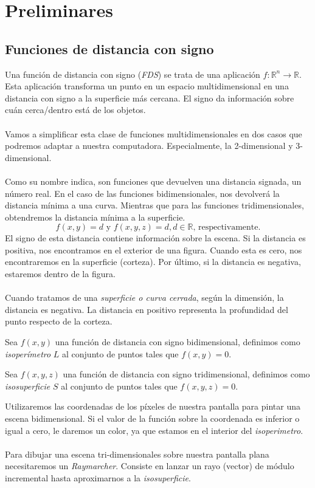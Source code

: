 \chapter{Preliminares}


\section{Funciones de distancia con signo}

Una función de distancia con signo (\textit{FDS}) se trata de una aplicación \(f: \mathbb{R}^n\longrightarrow \mathbb{R}\). Esta aplicación transforma un punto en un espacio multidimensional en una distancia con signo a la superficie más cercana. El signo da información sobre cuán cerca/dentro está de los objetos.\\\\
Vamos a simplificar esta clase de funciones multidimensionales en dos casos que podremos adaptar a nuestra computadora. Especialmente, la 2-dimensional y 3-dimensional.\\\\
Como su nombre indica, son funciones que devuelven una distancia signada, un número real. En el caso de las funciones bidimensionales, nos devolverá la distancia mínima a una curva. Mientras que para las funciones tridimensionales, obtendremos la distancia mínima a la superficie. 
\[f(x, y)=d \text{ y } f(x,y,z)=d , d \in \mathbb{R}\text{, respectivamente.}\]
El signo de esta distancia contiene información sobre la escena. Si la distancia es positiva, nos encontramos en el exterior de una figura. Cuando esta es cero, nos encontraremos en la superficie (corteza). Por último, si la distancia es negativa, estaremos dentro de la figura.\\\\
Cuando tratamos de una \textit{superficie o curva cerrada}, según la dimensión, la distancia es negativa. La distancia en positivo representa la profundidad del punto respecto de la corteza. 

\begin{definition}
	Sea \(f(x, y)\) una función de distancia con signo bidimensional, definimos como \textit{isoperímetro} \(L\) al conjunto de puntos tales que \(f(x,y) = 0\).
\end{definition}

\begin{definition}
	Sea \(f(x, y, z)\) una función de distancia con signo tridimensional, definimos como \textit{isosuperficie} \(S\) al conjunto de puntos tales que \(f(x, y, z) = 0\).
\end{definition}
Utilizaremos las coordenadas de los píxeles de nuestra pantalla para pintar una escena bidimensional. Si el valor de la función sobre la coordenada es inferior o igual a cero, le daremos un color, ya que estamos en el interior del \textit{isoperimetro}. \\\\
Para dibujar una escena tri-dimensionales sobre nuestra pantalla plana necesitaremos un \textit{Raymarcher}. Consiste en lanzar un rayo (vector) de módulo incremental hasta aproximarnos a la \textit{isosuperficie}. 
\newpage
